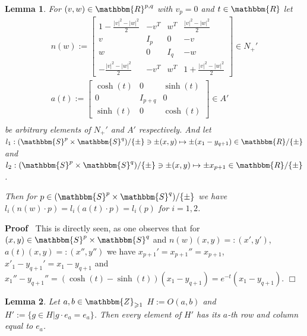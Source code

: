 \documentclass{article}
\newcommand{\assign}{:=}
\newenvironment{proof}{\noindent\textbf{Proof\ }}{\hspace*{\fill}$\Box$\medskip}
\numberwithin{definition}{section}
\newtheorem{lemma}{Lemma}
\numberwithin{lemma}{section}
\numberwithin{proposition}{section}
{\theorembodyfont{\rmfamily}\newtheorem{remark}{Remark}
\numberwithin{remark}{section}
}
\begin{document}
\begin{lemma}
  \label{doublePGP:lem-comput}For $( v, w) \in \mathbbm{R}^{p, q}$ with $v_p =
  0$ and $t \in \mathbbm{R}$ let
  \begin{eqnarray}
    & n ( w) \assign \left[ \begin{array}{cccc}
      1 - \frac{| v |^2 - | w |^2}{2} & - v^T & w^T & \frac{| v |^2 - | w
      |^2}{2}\\
      v & I_p & 0 & - v\\
      w & 0 & I_q & - w\\
      - \frac{| v |^2 - | w |^2}{2} & - v^T & w^T & 1 + \frac{| v |^2 - | w
      |^2}{2}
    \end{array} \right] \in N_+' &  \nonumber\\
    & a ( t) \assign \left[ \begin{array}{ccc}
      \cosh (t) & 0 & \sinh (t)\\
      0 & I_{p + q} & 0\\
      \sinh (t) & 0 & \cosh (t)
    \end{array} \right] \in A' &  \nonumber\\
    &  &  \nonumber
  \end{eqnarray}
  be arbitrary elements of $N_+'$ and $A'$ respectively. And let $l_1 : (
  \mathbbm{S}^p \times \mathbbm{S}^q) / \{ \pm \} \ni \pm ( x, y) \mapsto \pm
  ( x_1 - y_{q + 1}) \in \mathbbm{R}/ \{ \pm \}$ and $l_2 : ( \mathbbm{S}^p
  \times \mathbbm{S}^q) / \{ \pm \} \ni \pm ( x, y) \mapsto \pm x_{p + 1} \in
  \mathbbm{R}/ \{ \pm \}$.
  
  Then for $p \in ( \mathbbm{S}^p \times \mathbbm{S}^q) / \{ \pm \}$ we have
  $l_i ( n ( w) \cdot p) = l_i ( a ( t) \cdot p) = l_i ( p)$ for $i = 1, 2$.
\end{lemma}

\begin{proof}
  This is directly seen, as one observes that for $( x, y) \in \mathbbm{S}^p
  \times \mathbbm{S}^q$ and $n ( w) ( x, y) = : ( x', y')$, $a ( t) ( x, y) =
  : ( x'', y'')$ we have $x_{p + 1}' = x_{p + 1}'' = x_{p + 1}$, $x'_1 - y_{q
  + 1}' = x_1 - y_{q + 1}$ and $x_1'' - y_{q + 1}'' = ( \cosh ( t) - \sinh (
  t)) ( x_1 - y_{q + 1}) = e^{- t} ( x_1 - y_{q + 1})$.
\end{proof}

\begin{lemma}
  \label{doublePGP:lem-zerocolumn}Let $a, b \in \mathbbm{Z}_{\geqslant 1}$ $H
  \assign O ( a, b)$ and $H' \assign \{g \in H|g \cdot e_a = e_a \}$. Then
  every element of $H'$ has its $a$-th row and column equal to $e_a$.
\end{lemma}
\end{document}
